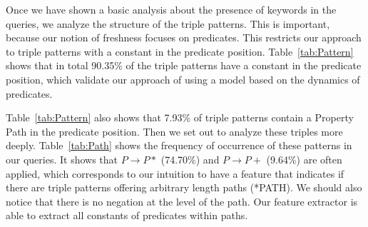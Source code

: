 \documentclass[runningheads]{llncs}
\begin{document}
Once we have shown a basic analysis about the presence of keywords in the queries, we analyze the structure of the triple patterns. This is important, because our notion of freshness focuses on predicates. This restricts our approach to triple patterns with a constant in the predicate position. Table~\ref{tab:Pattern} shows that in total 90.35\% of the triple patterns have a constant in the predicate position, which validate our approach of using a model based on the dynamics of predicates.

\begin{table}[h]
	\centering
	\caption{Triple patterns (C=Constant, V=Variable).}
	\label{tab:Pattern}
\end{table}

Table~\ref{tab:Pattern} also shows that 7.93\% of triple patterns contain a Property Path in the predicate position. Then we set out to analyze these triples more deeply. Table~\ref{tab:Path} shows the frequency of occurrence of these patterns in our queries. It shows that $ P \rightarrow P * $ (74.70\%) and $ P \rightarrow P + $ (9.64\%) are often applied, which corresponds to our intuition to have a feature that indicates if there are triple patterns offering arbitrary length paths (*PATH). We should also notice that there is no negation at the level of the path. Our feature extractor is able to extract all constants of predicates within paths.
\end{document}
